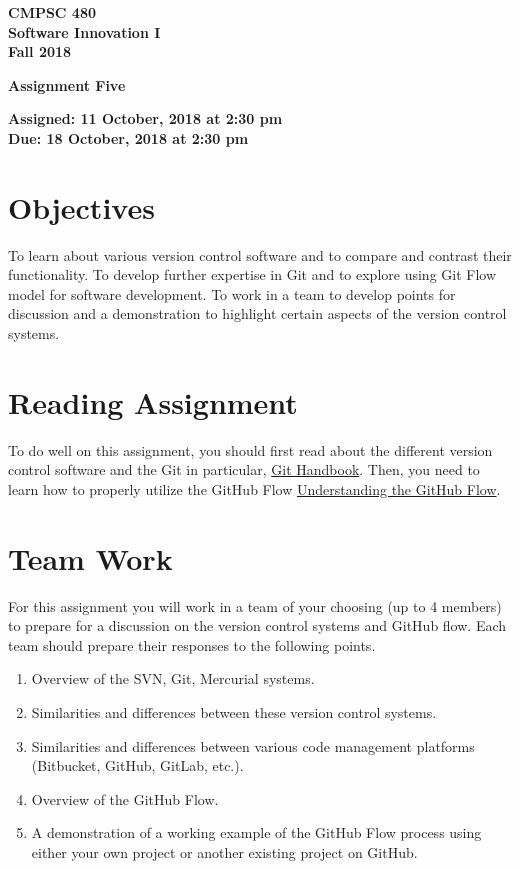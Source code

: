 \documentclass[11pt]{article}
\newcommand{\assignmentduedate}{18 October}
\newcommand{\assignmentassignedate}{ 11 October}
\newcommand{\assignmentnumber}{Five}
\newcommand{\labyear}{2018}
\newcommand{\labtime}{2:30 pm}
\newcommand{\assigneddate}{Assigned:  \assignmentassignedate, \labyear{} at \labtime{}}
\newcommand{\duedate}{Due:  \assignmentduedate, \labyear{} at \labtime{}}
\newcommand{\labtitle}[1]
{
  \begin{center}
    \begin{center}
      \bf
      CMPSC 480 \\ Software Innovation I\\
      Fall 2018\\
      \medskip
    \end{center}
    \bf
    #1
  \end{center}
}
\begin{document}
\thispagestyle{empty}

\labtitle{Assignment \assignmentnumber{} }
\begin{center} \textbf{ \assigneddate{} \\ \duedate{} } \end{center} 
\noindent \textbf{ }

\section*{Objectives}

To learn about various version control software and to compare and contrast their functionality. To develop further expertise in Git and to explore using Git Flow model for software development. To work in a team to develop points for discussion and a demonstration to highlight certain aspects of the  version control systems.

\section*{Reading Assignment}

To do well on this assignment, you
should first read about the different version control software and the Git in particular, \href{https://guides.github.com/introduction/git-handbook/}{Git Handbook}.
Then, you need to learn how to properly utilize the GitHub Flow  \href{
https://guides.github.com/introduction/flow/}{Understanding the GitHub Flow}.

\section*{Team Work}
For this assignment you will work in a team of your choosing (up to 4 members) to prepare for a discussion on the version control systems and GitHub flow. Each team should prepare their responses to the following points. 

\begin{enumerate}
	\item Overview of the SVN, Git, Mercurial systems.
	\item Similarities and differences between these version control systems.
	\item Similarities and differences between various code management platforms (Bitbucket, GitHub, GitLab, etc.).
	\item Overview of the GitHub Flow.
	\item A demonstration of a working example of the GitHub Flow process using either your own project or another existing project on GitHub.
\end{enumerate} 
\end{document}
